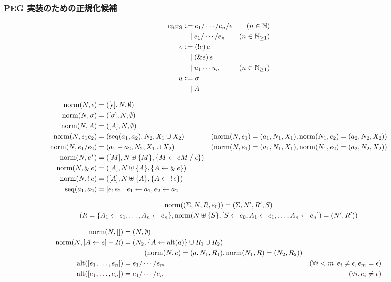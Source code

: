 \subsubsection{PEG 実装のための正規化候補}

\begin{align*}
  e_{\mathrm{RHS}}
  &\Coloneqq e_1 / \cdots / e_n / \epsilon &(n \in \Natural) \\
  &\BNFor e_1 / \cdots / e_n &(n \in \Natural_{\geq 1}) \\
  e
  &\Coloneqq (! e)\, e \\
  &\BNFor (\& e)\, e \\
  &\BNFor u_1 \cdots u_n &(n \in \Natural_{\geq 1}) \\
  u
  &\Coloneqq \sigma \\
  &\BNFor A
\end{align*}

\begin{align*}
  \mathop{\mathrm{norm}}(N, \epsilon) &= ([\epsilon], N, \emptyset) \\
  \mathop{\mathrm{norm}}(N, \sigma) &= ([\sigma], N, \emptyset) \\
  \mathop{\mathrm{norm}}(N, A) &= ([A], N, \emptyset) \\
  \mathop{\mathrm{norm}}(N, e_1 e_2) &= (\mathop{\mathrm{seq}}(a_1, a_2), N_2, X_1 \cup X_2) &(\mathop{\mathrm{norm}}(N, e_1) = (a_1, N_1, X_1), \mathop{\mathrm{norm}}(N_1, e_2) = (a_2, N_2, X_2)) \\
  \mathop{\mathrm{norm}}(N, e_1 / e_2) &= (a_1 + a_2, N_2, X_1 \cup X_2) &(\mathop{\mathrm{norm}}(N, e_1) = (a_1, N_1, X_1), \mathop{\mathrm{norm}}(N_1, e_2) = (a_2, N_2, X_2)) \\
  \mathop{\mathrm{norm}}(N, e^*) &= ([M], N \uplus \{M\}, \{M \gets e M \mathrel{/} \epsilon\}) \\
  \mathop{\mathrm{norm}}(N, \mathop{\&} e) &= ([A], N \uplus \{A\}, \{A \gets \mathop{\&} e\}) \\
  \mathop{\mathrm{norm}}(N, \mathop{!} e) &= ([A], N \uplus \{A\}, \{A \gets \mathop{!} e\}) \\
  \mathop{\mathrm{seq}}(a_1, a_2) &= [e_1 e_2 \mid e_1 \gets a_1, e_2 \gets a_2]
\end{align*}

\begin{gather*}
  \mathop{\mathrm{norm}}((\Sigma, N, R, e_0)) = (\Sigma, N', R', S) \\
  (R = \{A_1 \gets e_1, \ldots, A_n \gets e_n\}, \mathop{\mathrm{norm}}(N \uplus \{S\}, [S \gets e_0, A_1 \gets e_1, \ldots, A_n \gets e_n]) = (N', R'))
\end{gather*}

\begin{align*}
  \mathop{\mathrm{norm}}(N, []) &= (N, \emptyset) \\
  \mathop{\mathrm{norm}}(N, [A \gets e] + R) &= (N_2, \{A \gets \mathop{\mathrm{alt}}(a)\} \cup R_1 \cup R_2) \\
  &\hspace{3em}(\mathop{\mathrm{norm}}(N, e) = (a, N_1, R_1), \mathop{\mathrm{norm}}(N_1, R) = (N_2, R_2)) \\
  \mathop{\mathrm{alt}}([e_1, \ldots, e_n]) &= e_1 / \cdots / e_m &(\forall i < m\ldotp e_i \neq \epsilon, e_m = \epsilon) \\
  \mathop{\mathrm{alt}}([e_1, \ldots, e_n]) &= e_1 / \cdots / e_n &(\forall i\ldotp e_i \neq \epsilon)
\end{align*}
